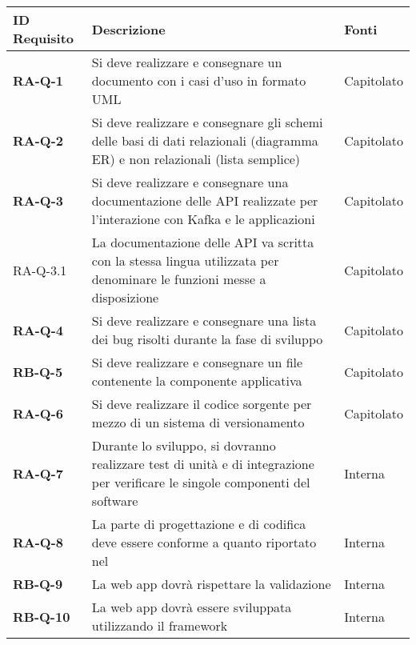 	\begin{center}
		\begin{longtable}{|p{3cm}|p{9.85cm}|p{2cm}|}
		\hline
		\rowcolor{gold_requisiti}
		{\color{white} \textbf{ID Requisito} } & {\color{white} \textbf{Descrizione} } & {\color{white} \textbf{Fonti} } \\ 
		\hline
		\endhead

		\textbf{RA-Q-1} & Si deve realizzare e consegnare un documento con i casi d'uso in formato UML & Capitolato \\ \hline
		\textbf{RA-Q-2} & Si deve realizzare e consegnare gli schemi delle basi di dati relazionali (diagramma ER) e non relazionali (lista semplice) & Capitolato\\ \hline
		\textbf{RA-Q-3} & Si deve realizzare e consegnare una documentazione delle API realizzate per l'interazione con Kafka e le applicazioni & Capitolato  \\ \hline
		{\color{gray} RA-Q-}3.1 & La documentazione delle API va scritta con la stessa lingua utilizzata per denominare le funzioni messe a disposizione & Capitolato \\ \hline
		\textbf{RA-Q-4} & Si deve realizzare e consegnare una lista dei bug risolti durante la fase di sviluppo & Capitolato  \\ \hline
		\textbf{RB-Q-5} & Si deve realizzare e consegnare un \glock{Docker} file contenente la componente applicativa & Capitolato  \\ \hline	
		\textbf{RA-Q-6} & Si deve realizzare il codice sorgente per mezzo di un sistema di versionamento & Capitolato  \\ \hline
		\textbf{RA-Q-7} & Durante lo sviluppo, si dovranno realizzare test di unità e di integrazione per verificare le singole componenti del software & Interna  \\ \hline	
		\textbf{RA-Q-8} & La parte di progettazione e di codifica deve essere conforme a quanto riportato nel \dext{Piano di Qualifica v1.0.0} & Interna  \\ \hline	
		\textbf{RB-Q-9} & La web app dovrà rispettare la validazione \glock{W3C} & Interna  \\ \hline	
		\textbf{RB-Q-10} & La web app dovrà essere sviluppata utilizzando il framework \glock{Bootstrap} & Interna  \\ \hline	


		\end{longtable}
	\end{center}

